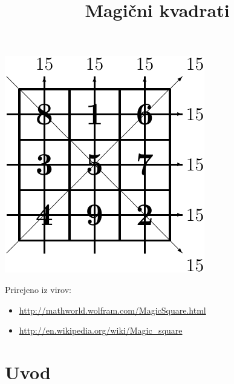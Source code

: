 \documentclass[a4paper,12pt]{article}
\title{Magični kvadrati}
\author{}
\theoremstyle{definition}
\theoremstyle{plain}
\begin{document}
\date{}
\maketitle

\begin{center}
   \includegraphics{slika.pdf}
\end{center}

Prirejeno iz virov:

\begin{itemize}
   \item \url{http://mathworld.wolfram.com/MagicSquare.html}
   \item \url{http://en.wikipedia.org/wiki/Magic_square}
\end{itemize}

\tableofcontents

\newpage

\section{Uvod}
\end{document}

